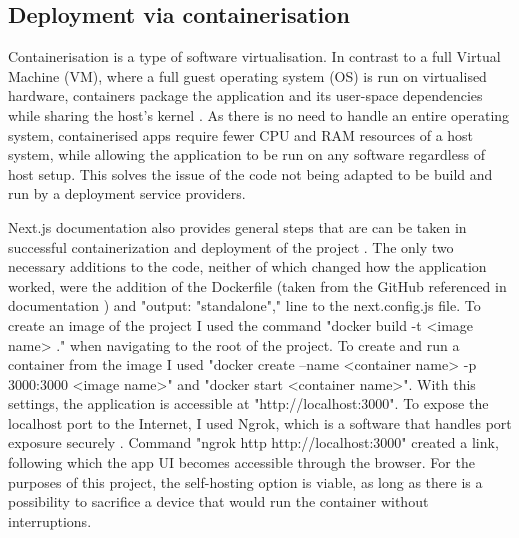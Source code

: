 \subsection{Deployment via containerisation}
Containerisation is a type of software virtualisation. In contrast to a full Virtual Machine (VM), where a full guest operating system (OS) is run on virtualised hardware, containers package the application and its user-space dependencies while sharing the host’s kernel \cite{containerisationArticle1, containerisationArticle2}. As there is no need to handle an entire operating system, containerised apps require fewer CPU and RAM resources of a host system, while allowing the application to be run on any software regardless of host setup. This solves the issue of the code not being adapted to be build and run by a deployment service providers.

Next.js documentation also provides general steps that are can be taken in successful containerization and deployment of the project \cite{vercelMainDeploymentMainPage, next.js/examples/with-docker}. The only two necessary additions to the code, neither of which changed how the application worked, were the addition of the Dockerfile (taken from the GitHub referenced in documentation \cite{next.js/examples/with-docker/Dockerfile}) and "output: "standalone"," line to the next.config.js file. To create an image of the project I used the command "docker build -t <image name> ." when navigating to the root of the project. To create and run a container from the image I used "docker create --name <container name> -p 3000:3000 <image name>" and "docker start <container name>". With this settings, the application is accessible at "http://localhost:3000". To expose the localhost port to the Internet, I used Ngrok, which is a software that handles port exposure securely \cite{ngrokMain} \cite{ngrokMainDocs}. Command "ngrok http http://localhost:3000" created a link, following which the app UI becomes accessible through the browser. For the purposes of this project, the self-hosting option is viable, as long as there is a possibility to sacrifice a device that would run the container without interruptions.

